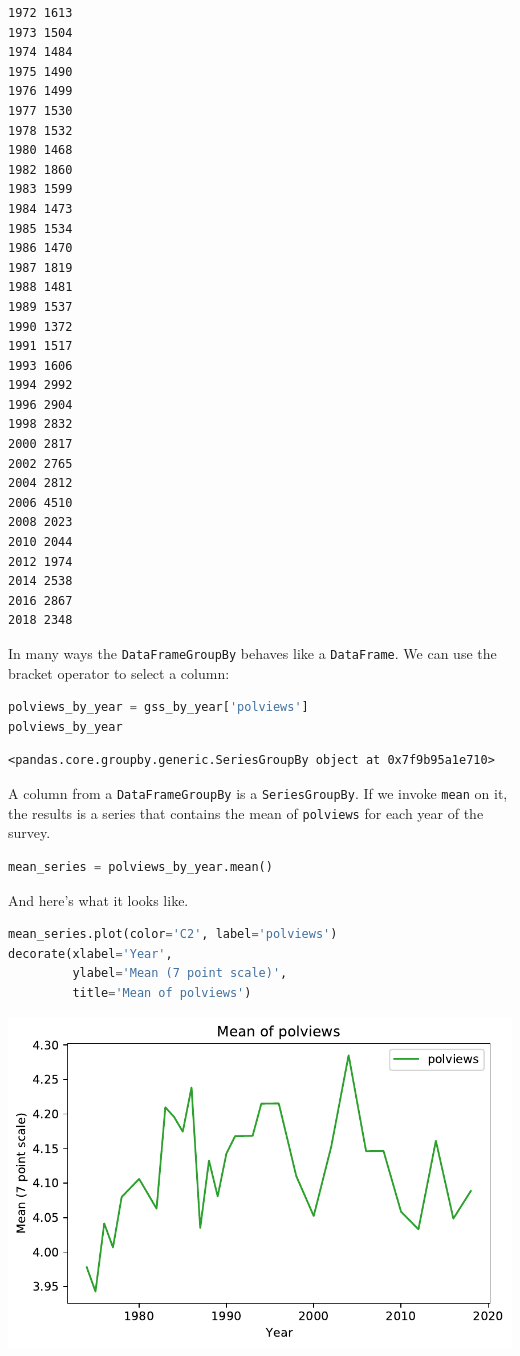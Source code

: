 \begin{lstlisting}[style=output]
1972 1613
1973 1504
1974 1484
1975 1490
1976 1499
1977 1530
1978 1532
1980 1468
1982 1860
1983 1599
1984 1473
1985 1534
1986 1470
1987 1819
1988 1481
1989 1537
1990 1372
1991 1517
1993 1606
1994 2992
1996 2904
1998 2832
2000 2817
2002 2765
2004 2812
2006 4510
2008 2023
2010 2044
2012 1974
2014 2538
2016 2867
2018 2348
\end{lstlisting}

In many ways the \passthrough{\lstinline!DataFrameGroupBy!} behaves like
a \passthrough{\lstinline!DataFrame!}. We can use the bracket operator
to select a column:

\begin{lstlisting}[language=Python,style=source]
polviews_by_year = gss_by_year['polviews']
polviews_by_year
\end{lstlisting}

\begin{lstlisting}[style=output]
<pandas.core.groupby.generic.SeriesGroupBy object at 0x7f9b95a1e710>
\end{lstlisting}

A column from a \passthrough{\lstinline!DataFrameGroupBy!} is a
\passthrough{\lstinline!SeriesGroupBy!}. If we invoke
\passthrough{\lstinline!mean!} on it, the results is a series that
contains the mean of \passthrough{\lstinline!polviews!} for each year of
the survey.

\begin{lstlisting}[language=Python,style=source]
mean_series = polviews_by_year.mean()
\end{lstlisting}

And here's what it looks like.

\begin{lstlisting}[language=Python,style=source]
mean_series.plot(color='C2', label='polviews')
decorate(xlabel='Year', 
         ylabel='Mean (7 point scale)',
         title='Mean of polviews')
\end{lstlisting}

\begin{center}
\includegraphics[scale=0.75]{02_polviews_files/02_polviews_46_0.pdf}
\end{center}

